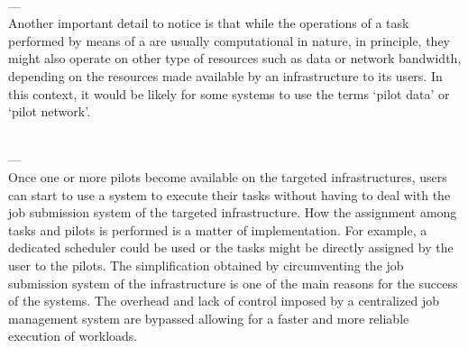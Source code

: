 \documentclass{sig-alternate}
\begin{document}
  \\---\\


Another important detail to notice is that while the operations of a
task performed by means of a \pilot are usually computational in
nature, in principle, they might also operate on other type of
resources such as data or network bandwidth, depending on the
resources made available by an infrastructure to its users. In this
context, it would be likely for some \pilotjob systems to use the
terms `pilot data' or `pilot network'. 

  \\---\\



Once one or more pilots become available on the targeted infrastructures, 
users can start to use a \pilotjob system to execute their tasks without 
having to deal with the job submission system of the targeted infrastructure. 
How the assignment among tasks and pilots is performed is a matter of 
implementation. For example, a dedicated scheduler could be used or the tasks 
might be directly assigned by the user to the pilots. The simplification 
obtained by circumventing the job submission system of the infrastructure is 
one of the main reasons for the success of the \pilotjob systems. The 
overhead and lack of control imposed by a centralized job management system 
are bypassed allowing for a faster and more reliable execution of workloads. 
\end{document}
